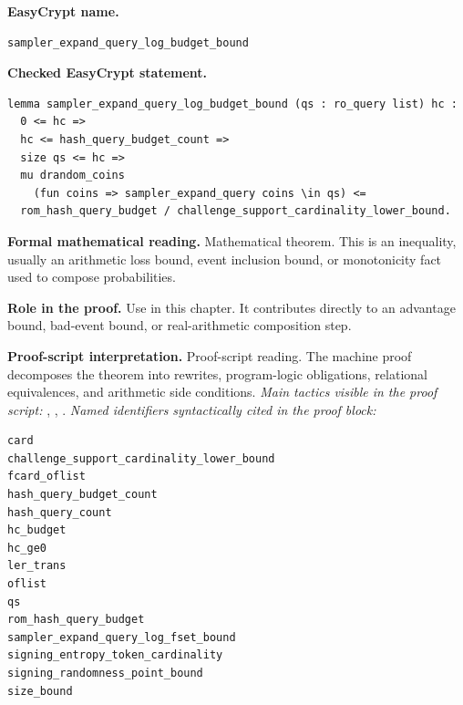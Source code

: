 \begin{formaltheorem}
\noindent\textbf{EasyCrypt name.}
\begin{lstlisting}[language=EasyCrypt,basicstyle=\ttfamily\scriptsize]
sampler_expand_query_log_budget_bound
\end{lstlisting}
\noindent\textbf{Checked EasyCrypt statement.}
\begin{lstlisting}[language=EasyCrypt,basicstyle=\ttfamily\scriptsize]
lemma sampler_expand_query_log_budget_bound (qs : ro_query list) hc :
  0 <= hc =>
  hc <= hash_query_budget_count =>
  size qs <= hc =>
  mu drandom_coins
    (fun coins => sampler_expand_query coins \in qs) <=
  rom_hash_query_budget / challenge_support_cardinality_lower_bound.
\end{lstlisting}
\noindent\textbf{Formal mathematical reading.}
Mathematical theorem. This is an inequality, usually an arithmetic loss bound, event inclusion bound, or monotonicity fact used to compose probabilities.

\noindent\textbf{Role in the proof.}
Use in this chapter. It contributes directly to an advantage bound, bad-event bound, or real-arithmetic composition step.

\noindent\textbf{Proof-script interpretation.}
Proof-script reading. The machine proof decomposes the theorem into rewrites, program-logic obligations, relational equivalences, and arithmetic side conditions.
\emph{Main tactics visible in the proof script:} , , .
\emph{Named identifiers syntactically cited in the proof block:}
\begin{lstlisting}[language=EasyCrypt,basicstyle=\ttfamily\scriptsize]
card
challenge_support_cardinality_lower_bound
fcard_oflist
hash_query_budget_count
hash_query_count
hc_budget
hc_ge0
ler_trans
oflist
qs
rom_hash_query_budget
sampler_expand_query_log_fset_bound
signing_entropy_token_cardinality
signing_randomness_point_bound
size_bound
\end{lstlisting}

\end{formaltheorem}

